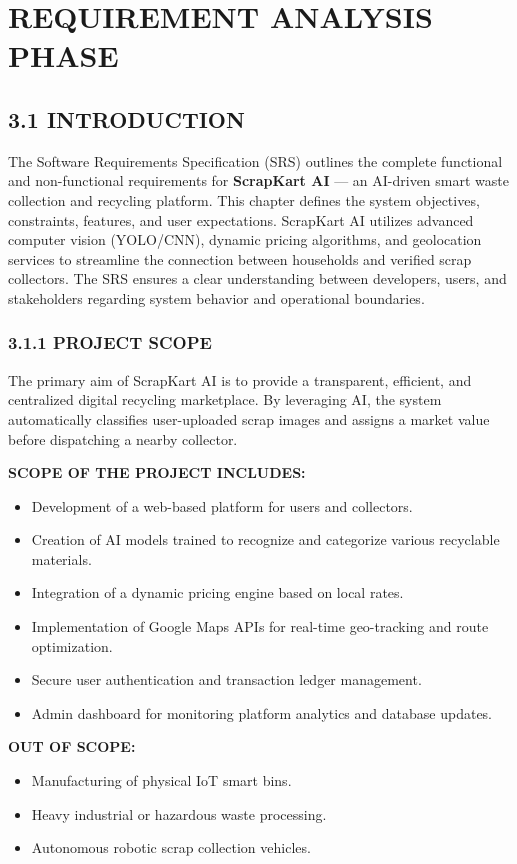\chapter{REQUIREMENT ANALYSIS PHASE}

\section{3.1 INTRODUCTION}
The Software Requirements Specification (SRS) outlines the complete functional and non-functional requirements for \textbf{ScrapKart AI} — an AI-driven smart waste collection and recycling platform. This chapter defines the system objectives, constraints, features, and user expectations. ScrapKart AI utilizes advanced computer vision (YOLO/CNN), dynamic pricing algorithms, and geolocation services to streamline the connection between households and verified scrap collectors. The SRS ensures a clear understanding between developers, users, and stakeholders regarding system behavior and operational boundaries.

\subsection{3.1.1 PROJECT SCOPE}
The primary aim of ScrapKart AI is to provide a transparent, efficient, and centralized digital recycling marketplace. By leveraging AI, the system automatically classifies user-uploaded scrap images and assigns a market value before dispatching a nearby collector.

\textbf{SCOPE OF THE PROJECT INCLUDES:}
\begin{itemize}
    \item Development of a web-based platform for users and collectors.
    \item Creation of AI models trained to recognize and categorize various recyclable materials.
    \item Integration of a dynamic pricing engine based on local rates.
    \item Implementation of Google Maps APIs for real-time geo-tracking and route optimization.
    \item Secure user authentication and transaction ledger management.
    \item Admin dashboard for monitoring platform analytics and database updates.
\end{itemize}

\textbf{OUT OF SCOPE:}
\begin{itemize}
    \item Manufacturing of physical IoT smart bins.
    \item Heavy industrial or hazardous waste processing.
    \item Autonomous robotic scrap collection vehicles.
\end{itemize}

